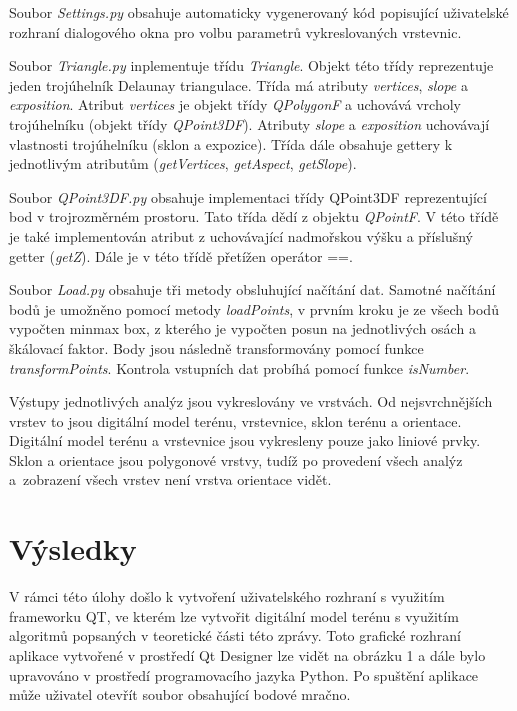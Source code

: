 \documentclass{article}
\begin{document}
\begin{spacing}{1.5}
Soubor \textit{Settings.py} obsahuje automaticky vygenerovaný kód popisující uživatelské rozhraní dialogového okna pro volbu parametrů vykreslovaných vrstevnic. 

Soubor \textit{Triangle.py} inplementuje třídu \textit{Triangle}. Objekt této třídy reprezentuje jeden trojúhelník Delaunay triangulace. Třída má atributy \textit{vertices}, \textit{slope} a \textit{exposition}. Atribut \textit{vertices} je objekt třídy \textit{QPolygonF} a uchovává vrcholy trojúhelníku (objekt třídy \textit{QPoint3DF}). Atributy \textit{slope} a \textit{exposition} uchovávají vlastnosti trojúhelníku (sklon a expozice). Třída dále obsahuje gettery k jednotlivým atributům (\textit{getVertices}, \textit{getAspect}, \textit{getSlope}).

Soubor \textit{QPoint3DF.py} obsahuje implementaci třídy QPoint3DF reprezentující bod v trojrozměrném prostoru. Tato třída dědí z objektu \textit{QPointF}. V této třídě je také implementován atribut z uchovávající nadmořskou výšku a příslušný getter (\textit{getZ}). Dále je v této třídě přetížen operátor ==.

Soubor \textit{Load.py} obsahuje tři metody obsluhující načítání dat. Samotné načítání bodů je umožněno pomocí metody \textit{loadPoints}, v prvním kroku je ze všech bodů vypočten minmax box, z kterého je vypočten posun na jednotlivých osách a škálovací faktor. Body jsou následně transformovány pomocí funkce \textit{transformPoints}. Kontrola vstupních dat probíhá pomocí funkce \textit{isNumber}.

Výstupy jednotlivých analýz jsou vykreslovány ve vrstvách. Od nejsvrchnějších vrstev to jsou digitální model terénu, vrstevnice, sklon terénu a orientace. Digitální model terénu  a vrstevnice jsou vykresleny pouze jako liniové prvky. Sklon a orientace jsou polygonové vrstvy, tudíž po provedení všech analýz a~zobrazení všech vrstev není vrstva orientace vidět.


\section{Výsledky}
V rámci této úlohy došlo k vytvoření uživatelského rozhraní s využitím frameworku QT, ve kterém lze vytvořit digitální model terénu s využitím algoritmů popsaných v teoretické části této zprávy. Toto grafické rozhraní aplikace vytvořené v prostředí Qt Designer lze vidět na obrázku 1 a dále bylo upravováno v prostředí programovacího jazyka Python. Po spuštění aplikace může uživatel otevřít soubor obsahující bodové mračno.


\end{spacing}
\end{document}
